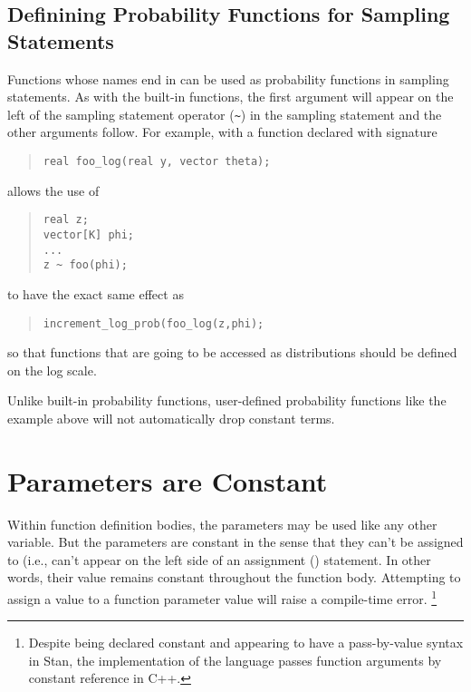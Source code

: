 \subsection{Definining Probability Functions for Sampling Statements}

Functions whose names end in  can be used as probability
functions in sampling statements.  As with the built-in functions, the
first argument will appear on the left of the sampling
statement operator (\Verb|~|) in the sampling statement and the other
arguments follow.  For example, with a function declared with signature
%
\begin{quote}
\begin{Verbatim}
real foo_log(real y, vector theta);
\end{Verbatim}
\end{quote}
%
allows the use of 
%
\begin{quote}
\begin{Verbatim}
real z;
vector[K] phi;
...
z ~ foo(phi);
\end{Verbatim}
\end{quote}
%
to have the exact same effect as
%
\begin{quote}
\begin{Verbatim}
increment_log_prob(foo_log(z,phi);
\end{Verbatim}
\end{quote}
%
so that functions that are going to be accessed as distributions
should be defined on the log scale.

Unlike built-in probability functions, user-defined probability
functions like the example  above will not automatically
drop constant terms.

\section{Parameters are Constant}

Within function definition bodies, the parameters may be used like any
other variable.  But the parameters are constant in the sense that
they can't be assigned to (i.e., can't appear on the left side of an
assignment (\code{<-}) statement.  In other words, their value remains
constant throughout the function body.  Attempting to assign a value
to a function parameter value will raise a compile-time error.%
%
\footnote{Despite being declared constant and appearing to have a
  pass-by-value syntax in Stan, the implementation of the language
  passes function arguments by constant reference in C++.}


